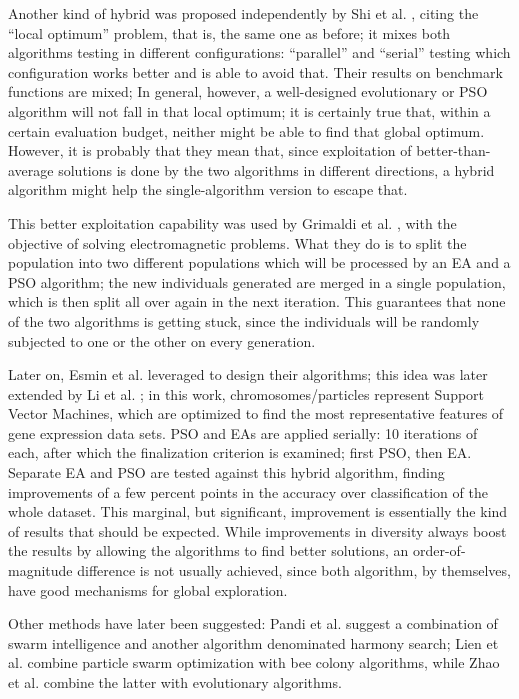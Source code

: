 \documentclass[runningheads]{llncs}
\begin{document}
Another kind of hybrid was proposed independently by
Shi et al. \cite{shi2003hybrid}, citing the ``local optimum'' problem,
that is, the same one as before; it mixes both algorithms
testing in different configurations: ``parallel'' and ``serial''
testing which configuration works better and is able to avoid
that. Their results on benchmark functions are mixed;
In general, however, a well-designed evolutionary or PSO
algorithm will not fall in that local optimum; it is certainly true
that, within a certain evaluation budget, neither might be able to
find that global optimum. However, it is probably that they mean that,
since exploitation of better-than-average solutions is done by the two
algorithms in different directions, a hybrid algorithm might help the
single-algorithm version to escape that.

This better exploitation capability was used by Grimaldi et al.
\cite{grimaldi2005genetical}, with the objective of solving
electromagnetic problems. What they do is
to split the population into two different populations which will be
processed by an EA and a PSO algorithm; the new individuals generated
are merged in a single population, which is then split all over again
in the next iteration. This guarantees that none of the two algorithms
is getting stuck, since the individuals will be randomly subjected to
one or the other on every generation.

Later on, Esmin et al. \cite{esmin2006hybrid} leveraged to design their
algorithms; this idea was
later extended by Li et al. \cite{li2008gene}; in this work,
chromosomes/particles represent Support Vector Machines, which are
optimized to find the most representative features of gene expression
data sets. PSO and EAs are applied serially: 10 iterations of each,
after which the finalization criterion is examined; first PSO, then
EA. Separate EA and PSO are tested against this hybrid algorithm,
finding improvements of a few percent points in the accuracy over
classification of the whole dataset. This marginal, but significant,
improvement is essentially the kind of results that should be
expected. While improvements in diversity always boost the results by
allowing the algorithms to find better solutions, an
order-of-magnitude difference is not usually  achieved, since both
algorithm, by themselves, have good mechanisms for global
exploration.

Other methods have later been suggested: Pandi et al. \cite{pandi2011dynamic}
suggest a combination of swarm intelligence and another algorithm
denominated harmony search; Lien et al. \cite{lien2012hybrid} combine
particle swarm optimization with bee colony algorithms, while Zhao et
al. \cite{zhao2010hybrid} combine the latter with evolutionary
algorithms.
\end{document}
